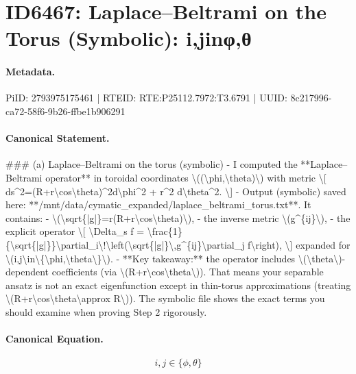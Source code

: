 \section*{ID6467: Laplace–Beltrami on the Torus (Symbolic): i,jinφ,θ}
\paragraph{Metadata.}
PiID: 2793975175461 | RTEID: RTE:P25112.7972:T3.6791 | UUID: 8c217996-ca72-58f6-9b26-ffbe1b906291

\paragraph{Canonical Statement.}
\#\#\# (a) Laplace–Beltrami on the torus (symbolic) - I computed the **Laplace–Beltrami operator** in toroidal coordinates \textbackslash{}((\textbackslash{}phi,\textbackslash{}theta)\textbackslash{}) with metric \textbackslash{}[ ds\textasciicircum{}2=(R+r\textbackslash{}cos\textbackslash{}theta)\textasciicircum{}2d\textbackslash{}phi\textasciicircum{}2 + r\textasciicircum{}2 d\textbackslash{}theta\textasciicircum{}2. \textbackslash{}] - Output (symbolic) saved here: **/mnt/data/cymatic\_expanded/laplace\_beltrami\_torus.txt**. It contains: - \textbackslash{}(\textbackslash{}sqrt\{|g|\}=r(R+r\textbackslash{}cos\textbackslash{}theta)\textbackslash{}), - the inverse metric \textbackslash{}(g\textasciicircum{}\{ij\}\textbackslash{}), - the explicit operator \textbackslash{}[ \textbackslash{}Delta\_s f = \textbackslash{}frac\{1\}\{\textbackslash{}sqrt\{|g|\}\}\textbackslash{}partial\_i\textbackslash{}!\textbackslash{}left(\textbackslash{}sqrt\{|g|\}\textbackslash{},g\textasciicircum{}\{ij\}\textbackslash{}partial\_j f\textbackslash{}right), \textbackslash{}] expanded for \textbackslash{}(i,j\textbackslash{}in\textbackslash{}\{\textbackslash{}phi,\textbackslash{}theta\textbackslash{}\}\textbackslash{}). - **Key takeaway:** the operator includes \textbackslash{}(\textbackslash{}theta\textbackslash{})-dependent coefficients (via \textbackslash{}(R+r\textbackslash{}cos\textbackslash{}theta\textbackslash{})). That means your separable ansatz is not an exact eigenfunction except in thin-torus approximations (treating \textbackslash{}(R+r\textbackslash{}cos\textbackslash{}theta\textbackslash{}approx R\textbackslash{})). The symbolic file shows the exact terms you should examine when proving Step 2 rigorously.

\paragraph{Canonical Equation.}
\[
i,j\in\{\phi,\theta\}
\]

